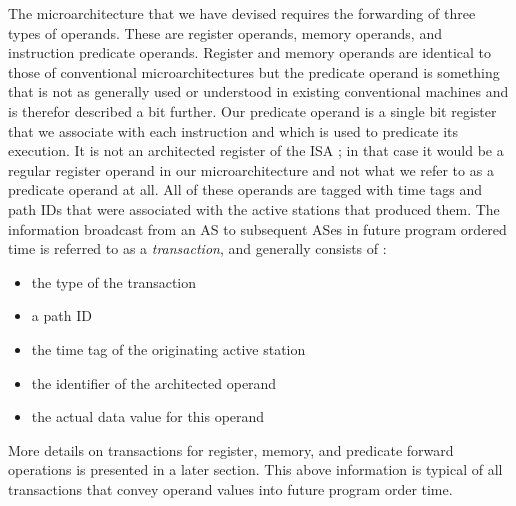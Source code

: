 \documentclass[10pt,dvips]{article}
\begin{document}
The microarchitecture that we have devised requires the
forwarding of three types of operands.  These are register
operands, memory operands, and instruction predicate operands.
Register and memory operands are identical to those of
conventional microarchitectures but the predicate operand is
something that is not as generally used or understood in
existing conventional machines and is therefor described a bit further.
Our predicate operand is
a single bit register that we associate with each instruction and
which is used to predicate its execution.  It is not an architected
register of the ISA ; 
in that case it would be a regular register operand in our microarchitecture
and not what we refer to as a predicate operand at all.
All of these operands are tagged with time tags 
and path IDs that were associated
with the active stations that produced them.
The information 
broadcast from an AS to subsequent
ASes in future program ordered time is referred
to as a {\em transaction}, and generally consists of :
%
\vspace{-0.05in}
\begin{itemize}
\vspace{-0.1in}
\item{the type of the transaction}
\vspace{-0.1in}
\item{a path ID}
\vspace{-0.1in}
\item{the time tag of the originating active station}
\vspace{-0.1in}
\item{the identifier of the architected operand}
\vspace{-0.1in}
\item{the actual data value for this operand}
\vspace{-0.1in}
\end{itemize}   
%
More details on transactions for register, memory, and
predicate forward operations is presented in a later section.
This above information is typical of all transactions that
convey operand values into future program order time.
\end{document}
